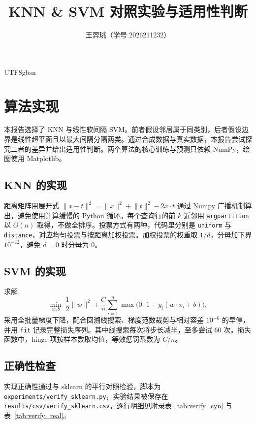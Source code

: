 \documentclass{article}
\title{KNN \& SVM 对照实验与适用性判断}
\author{\textmd{王羿珧\;（学号 2026211232）}}
\begin{document}
\begin{CJK}{UTF8}{gbsn}

\maketitle

\section{算法实现}

本报告选择了 KNN 与线性软间隔 SVM。前者假设邻居属于同类别，后者假设边界是线性超平面且以最大间隔分隔两类。通过合成数据与真实数据，本报告尝试探究二者的差异并给出适用性判断。两个算法的核心训练与预测只依赖 NumPy，绘图使用 Matplotlib。

\subsection{KNN 的实现}

距离矩阵用展开式 $\lVert x-t\rVert^2=\lVert x\rVert^2+\lVert t\rVert^2-2x\!\cdot\!t$ 通过 Numpy 广播机制算出，避免使用计算缓慢的 Python 循环。每个查询行的前 $k$ 近邻用 \texttt{argpartition} 以 $O(n)$ 取得，不做全排序。投票方式有两种，代码里分别是 \texttt{uniform} 与 \texttt{distance}，对应均匀投票与按距离加权投票。加权投票的权重取 $1/d$，分母加下界 $10^{-12}$，避免 $d{=}0$ 时分母为 0。

\subsection{SVM 的实现}

求解
\begin{equation}
\min_{w,b}\;\frac{1}{2}\lVert w\rVert^2+\frac{C}{n}\sum_{i=1}^{n}\max\bigl(0,\,1-y_i(w\!\cdot\!x_i+b)\bigr),
\label{eq:svm}
\end{equation}
采用全批量梯度下降，配合回溯线搜索、梯度范数裁剪与相对容差 $10^{-6}$ 的早停，并用 \texttt{fit} 记录完整损失序列。其中线搜索每次将步长减半，至多尝试 60 次。损失函数中，hinge 项按样本数取均值，等效惩罚系数为 $C/n$。

\subsection{正确性检查}

实现正确性通过与 sklearn 的平行对照检验，脚本为 \texttt{experiments/verify\_sklearn.py}，实验结果被保存在 \texttt{results/csv/verify\_sklearn.csv}，逐行明细见附录表~\ref{tab:verify_syn} 与表~\ref{tab:verify_real}。


\end{CJK}
\end{document}
